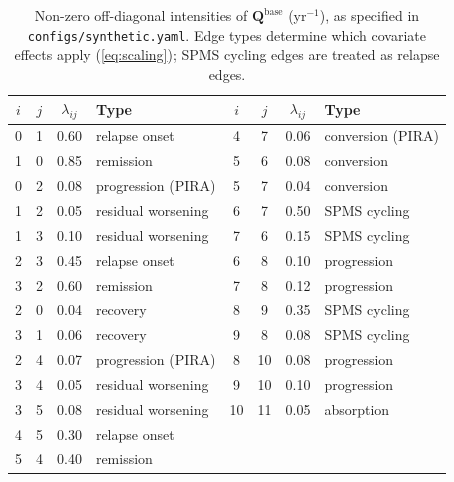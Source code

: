 \documentclass[11pt,a4paper]{article}
\newcommand{\Q}{\mathbf{Q}}
\newcommand{\soft}[1]{\texttt{#1}}
\begin{document}
\begin{table}[htbp]
\centering
\caption{Non-zero off-diagonal intensities of $\Q^{\mathrm{base}}$ (yr$^{-1}$), as specified in \soft{configs/synthetic.yaml}. Edge types determine which covariate effects apply (\cref{eq:scaling}); SPMS cycling edges are treated as relapse edges.}
\label{tab:Q}
\small
\begin{tabular}{cccl@{\hspace{1.4em}}cccl}
\toprule
$i$ & $j$ & $\lambda_{ij}$ & Type & $i$ & $j$ & $\lambda_{ij}$ & Type\\
\midrule
0 & 1 & 0.60 & relapse onset & 4 & 7 & 0.06 & conversion (PIRA)\\
1 & 0 & 0.85 & remission & 5 & 6 & 0.08 & conversion\\
0 & 2 & 0.08 & progression (PIRA) & 5 & 7 & 0.04 & conversion\\
1 & 2 & 0.05 & residual worsening & 6 & 7 & 0.50 & SPMS cycling\\
1 & 3 & 0.10 & residual worsening & 7 & 6 & 0.15 & SPMS cycling\\
2 & 3 & 0.45 & relapse onset & 6 & 8 & 0.10 & progression\\
3 & 2 & 0.60 & remission & 7 & 8 & 0.12 & progression\\
2 & 0 & 0.04 & recovery & 8 & 9 & 0.35 & SPMS cycling\\
3 & 1 & 0.06 & recovery & 9 & 8 & 0.08 & SPMS cycling\\
2 & 4 & 0.07 & progression (PIRA) & 8 & 10 & 0.08 & progression\\
3 & 4 & 0.05 & residual worsening & 9 & 10 & 0.10 & progression\\
3 & 5 & 0.08 & residual worsening & 10 & 11 & 0.05 & absorption\\
4 & 5 & 0.30 & relapse onset & & & & \\
5 & 4 & 0.40 & remission & & & & \\
\bottomrule
\end{tabular}
\end{table}
\end{document}
